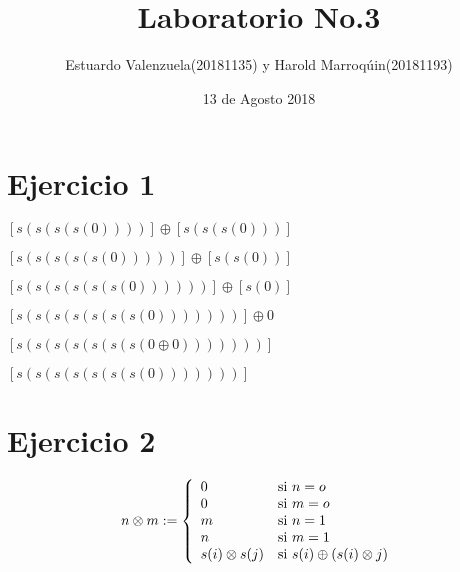 \documentclass{article}
\author{Estuardo Valenzuela(20181135) y Harold Marroqúin(20181193)}
\title{Laboratorio No.3}
\date{13 de Agosto 2018}
\begin{document}
\linespread{1.1}

\maketitle

\section{Ejercicio 1}\par
\begin{center}

$[s(s(s(s(0))))] \oplus [s(s(s(0)))]$ 
\end{center}
\begin{center}
$[s(s(s(s(s(0)))))] \oplus [s(s(0))] $
\end{center}
\begin{center}
$[s(s(s(s(s(s(0))))))] \oplus [s(0)]$ 
\end{center}
\begin{center}
$[s(s(s(s(s(s(s(0)))))))] \oplus 0 $
\end{center}
\begin{center}
$[s(s(s(s(s(s(s(0\oplus 0)))))))]$
\end{center}
\begin{center}
$[s(s(s(s(s(s(s(0)))))))]$
\end{center}
\section{Ejercicio 2}
\[
n\otimes m := \left\{
\begin{array}{l l}
0 & \mbox{si } n=o \\
0 & \mbox{si } m=o \\
m & \mbox{si } n=1 \\
n & \mbox{si } m=1 \\ 
s(i)\otimes s(j) & \mbox{si } s(i) \oplus (s(i)\otimes j)\\
\end{array}
\right.
 \]
\end{document}
